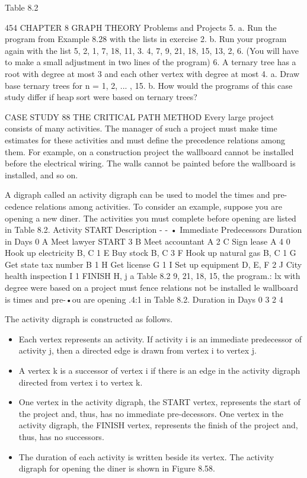 \documentclass{article}
\begin{document}
Table 8.2 



454 CHAPTER 8 GRAPH THEORY 
Problems and Projects 5. a. Run the program from Example 8.28 with the lists in exercise 2. b. Run your program again with the list 5, 2, 1, 7, 18, 11, 3. 4, 7, 9, 21, 18, 15, 13, 2, 6. (You will have to make a small adjustment in two lines of the program) 6. A ternary tree has a root with degree at most 3 and each other vertex with degree at most 4. a. Draw base ternary trees for n = 1, 2, ... , 15. b. How would the programs of this case study differ if heap sort were based on ternary trees? 

CASE STUDY 88 THE CRITICAL PATH METHOD
Every large project consists of many activities. 
The manager of such a project must make time estimates for these activities and must define the precedence relations among them.
For example, on a construction project the wallboard cannot be installed before the electrical wiring. The walls cannot be painted before the wallboard is installed, and so on. 

A digraph called an activity digraph can be used to model the times and pre-cedence relations among activities. To consider an example, suppose you are opening a new diner. 
The activities you must complete before opening are listed in Table 8.2. 
Activity START Description - - • Immediate Predecessors Duration in Days 0 A Meet lawyer START 3 B Meet accountant A 2 C Sign lease A 4 0 Hook up electricity B, C 1 E Buy stock B, C 3 F Hook up natural gas B, C 1 G Get state tax number B 1 H Get license G 1 I Set up equipment D, E, F 2 J City health inspection I 1 FINISH H, j a 
Table 8.2 
9, 21, 18, 15, the program.: lx with degree were based on 
a project must fence relations not be installed le wallboard is times and pre-•ou are opening .4:1 in Table 8.2. 
Duration in Days 
0 3 2 4 

The activity digraph is constructed as follows. 
\begin{itemize}
    \item Each vertex represents an activity. If activity i is an immediate predecessor of activity j, then a directed edge is drawn from vertex i to vertex j. 
    \item A vertex k is a successor of vertex i if there is an edge in the activity digraph directed from vertex i to vertex k. 
    \item One vertex in the activity digraph, the START vertex, represents the start of the project and, thus, has no immediate pre-decessors. 
    \itme One vertex in the activity digraph, the FINISH vertex, represents the finish of the project and, thus, has no successors. \item The duration of each activity is written beside its vertex. The activity digraph for opening the diner is shown in Figure 8.58. 
\end{itemize}
\end{document}

